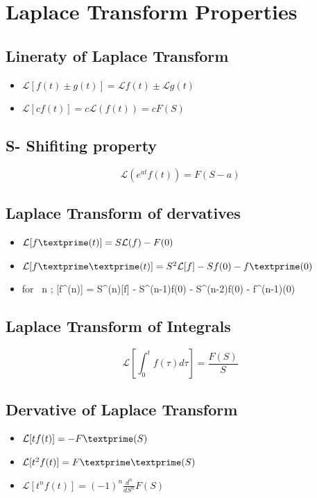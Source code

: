 \documentclass[11pt]{article}
\theoremstyle{definition}
\newcommand{\bb}{\mathcal{L}}
\begin{document}
\section{Laplace Transform Properties} 

\subsection{Lineraty of Laplace Transform}

\begin{itemize}
    \item $ \bb{[f(t) \pm g(t)]} = \bb{f(t)} \pm \bb{g(t)}$
    \item $ \bb{[cf(t)]} = c\bb{(f(t))} = cF(S)$ 
\end{itemize}    

\subsection{S- Shifiting property}

\begin{equation}
    \bb{(e^{at}f(t))} = F(S-a)
\end{equation}

\subsection{Laplace Transform of dervatives} 

\begin{itemize}
    \item $ \bb{[f\textprime(t)]} = S\bb(f) - F(0)  $
    \item  $\bb[f\textprime\textprime(t)] = S^2\bb[f] - Sf(0) - f\textprime(0) $    
    \item for \ n ; \bb[f^{(n)}] = S^{(n)}\bb[f] - S^{(n-1)}f(0) - S^{(n-2)}f\textprime(0) - \dotsc f^{(n-1)}(0)
\end{itemize}

\subsection{Laplace Transform of Integrals}

\begin{equation}
    \bb[\int_0^tf(\tau)d\tau] = \frac{F(S)}{S}
\end{equation}

\subsection{Dervative of Laplace Transform}
\begin{itemize}
    \item $\bb[tf(t)] = -F\textprime(S) $
    \item $\bb[t^2f(t)] = F\textprime \textprime(S)$ 
    \item $\bb[t^nf(t)] = {(-1)}^n \frac{d^n}{dS^n} F(S)$    
\end{itemize}         
\end{document}
